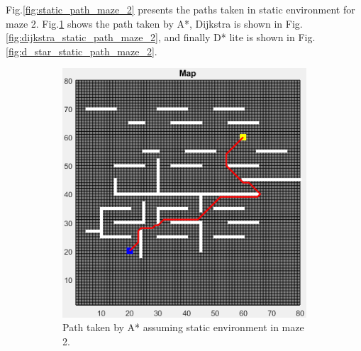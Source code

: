 
Fig.\:\ref{fig:static_path_maze_2} presents the paths taken in static environment for maze 2. Fig.\:\ref{fig:a_star_static_path_maze_2} shows the path taken by A*, Dijkstra is shown in Fig.\:\ref{fig:dijkstra_static_path_maze_2}, and finally D* lite is shown in Fig.\:\ref{fig:d_star_static_path_maze_2}.

\begin{figure}
	\centering
    \begin{subfigure}[t]{0.32\columnwidth}
		\centering
		\includegraphics[width=\textwidth]{images/a_star_static_maze_2.png}
		\caption{Path taken by A* assuming static environment in maze 2.}
        \label{fig:a_star_static_path_maze_2}
	\end{subfigure}
    \hfill
	\begin{subfigure}[t]{0.32\columnwidth}
		\centering

\end{subfigure}
\end{figure}
